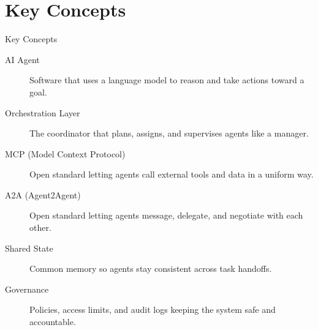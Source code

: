 \documentclass[10pt]{beamer}
\begin{document}
\section{Key Concepts}
\begin{frame}[allowframebreaks]{Key Concepts}
  \begin{description}
    \item[AI Agent] Software that uses a language model to reason and take actions toward a goal.
    \item[Orchestration Layer] The coordinator that plans, assigns, and supervises agents like a manager.
    \item[MCP (Model Context Protocol)] Open standard letting agents call external tools and data in a uniform way.
    \item[A2A (Agent2Agent)] Open standard letting agents message, delegate, and negotiate with each other.
    \item[Shared State] Common memory so agents stay consistent across task handoffs.
    \item[Governance] Policies, access limits, and audit logs keeping the system safe and accountable.
  \end{description}
\end{frame}
\end{document}
